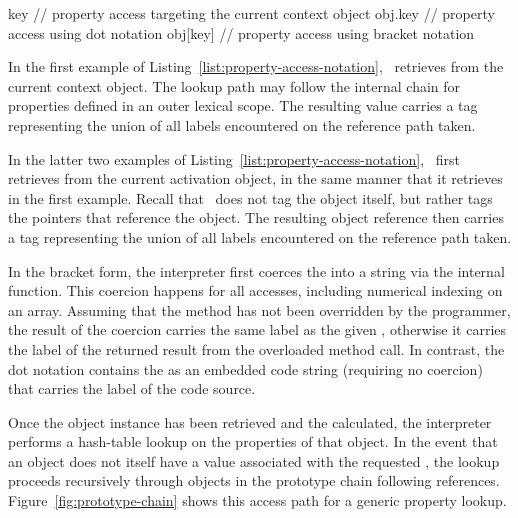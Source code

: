 \begin{jscode}
key      // property access targeting the current context object
obj.key  // property access using dot notation
obj[key] // property access using bracket notation
\end{jscode}

In the first example of Listing~\ref{list:property-access-notation}, \FlowCore\ retrieves  from the current context object.
The lookup path may follow the internal  chain for properties defined in an outer lexical scope.
The resulting value  carries a tag representing the union of all labels encountered on the reference path taken.

In the latter two examples of Listing~\ref{list:property-access-notation}, \FlowCore\ first retrieves  from the current activation object, in the same manner that it retrieves  in the first example.
Recall that \FlowCore\ does not tag the object itself, but rather tags the pointers that reference the object.
The resulting object reference  then carries a tag representing the union of all labels encountered on the reference path taken.

In the bracket form, the interpreter first coerces the  into a string via the internal  function.
This coercion happens for all accesses, including numerical indexing on an array.
Assuming that the  method has not been overridden by the programmer, the result of the coercion carries the same label as the given , otherwise it carries the label of the returned result from the overloaded method call.
In contrast, the dot notation contains the  as an embedded code string (requiring no coercion) that carries the label of the code source.

Once the object instance  has been retrieved and the  calculated, the interpreter performs a hash-table lookup on the properties of that object.
In the event that an object does not itself have a value associated with the requested , the lookup proceeds recursively through objects in the prototype chain following  references.
Figure~\ref{fig:prototype-chain} shows this access path for a generic property lookup.

